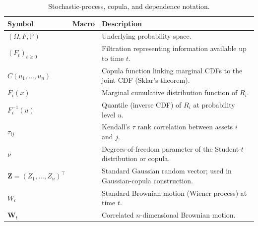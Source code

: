\documentclass[12pt,openany]{book}
\newcommand{\Prob}{\mathbb{P}}
\newcommand{\calF}{\mathcal{F}}
\numberwithin{equation}{chapter}
\theoremstyle{plain}
\theoremstyle{definition}
\theoremstyle{remark}
\renewcommand{\arraystretch}{1.2}
\def\mathcal#1{#1}%
\def\calF{F}%
\begin{document}
\begin{table}[H]
\renewcommand{\arraystretch}{1.35}
\caption{Stochastic-process, copula, and dependence notation.}
\label{tab:symbols-stoch}
\begin{tabularx}{\linewidth}{@{} l l X @{}}
\toprule
\textbf{Symbol} & \textbf{Macro} & \textbf{Description} \\
\midrule
$(\Omega,\calF,\Prob)$ & &
  Underlying probability space. \\
$(\calF_t)_{t\geq0}$ & &
  Filtration representing information available up to time $t$. \\
$C(u_1,\ldots,u_n)$ & &
  Copula function linking marginal CDFs to the joint CDF
  (Sklar's theorem). \\
$F_i(x)$ & &
  Marginal cumulative distribution function of $R_i$. \\
$F_i^{-1}(u)$ & &
  Quantile (inverse CDF) of $R_i$ at probability level $u$. \\
$\tau_{ij}$ & &
  Kendall's $\tau$ rank correlation between assets $i$ and $j$. \\
$\nu$ & &
  Degrees-of-freedom parameter of the Student-$t$ distribution or copula. \\
$\mathbf{Z}=(Z_1,\ldots,Z_n)^\top$ & &
  Standard Gaussian random vector; used in Gaussian-copula construction. \\
$W_t$ & &
  Standard Brownian motion (Wiener process) at time $t$. \\
$\mathbf{W}_t$ & &
  Correlated $n$-dimensional Brownian motion. \\
\bottomrule
\end{tabularx}
\end{table}
\end{document}
